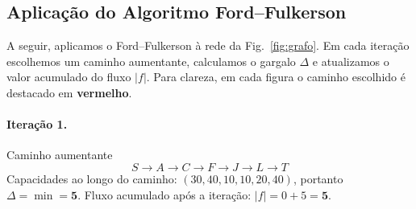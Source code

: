 \documentclass[12pt]{article}
\begin{document}
\newpage

\subsection{Aplicação do Algoritmo Ford--Fulkerson}

A seguir, aplicamos o Ford--Fulkerson à rede da Fig.~\ref{fig:grafo}. Em cada iteração escolhemos um caminho aumentante, calculamos o gargalo \(\Delta\) e atualizamos o valor acumulado do fluxo \( |f|\). Para clareza, em cada figura o caminho escolhido é destacado em \textbf{vermelho}.

\paragraph{Iteração 1.} Caminho aumentante
\[
S \to A \to C \to F \to J \to L \to T
\]
Capacidades ao longo do caminho: \((30,40,10,10,20,40)\), portanto \(\Delta = \min = \mathbf{5}\).
Fluxo acumulado após a iteração: \(|f|= 0+5 = \mathbf{5}\).
\end{document}
